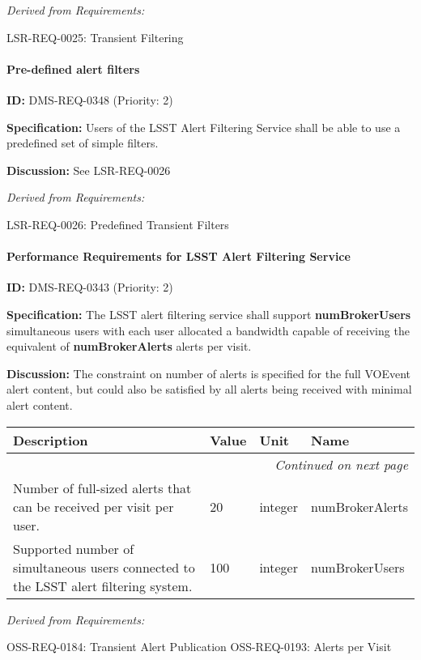 \documentclass[SE,toc,lsstdraft]{lsstdoc}
\makeatletter
\newcommand{\paramname}[1]{\hspace{0pt}#1}
\newcommand{\unitname}[1]{\hspace{0pt}#1}
\newenvironment{parameters}[0]{%
\setlength\LTleft{0pt}
\setlength\LTright{\fill}
\begin{small}
\begin{longtable}[]{|p{0.49\textwidth}|l|p{0.6in}|p{1.70in}@{}|}

\hline \textbf{Description} & \textbf{Value} & \textbf{Unit} & \textbf{Name} \\ \hline
\endhead

\hline \multicolumn{4}{r}{\emph{Continued on next page}} \\
\endfoot

\hline\hline
\endlastfoot
}{%
\hline
\end{longtable}
\end{small}
}
\makeatother
\begin{document}
\emph{Derived from Requirements:}

LSR-REQ-0025:
Transient Filtering \newline

\paragraph{Pre-defined alert filters}\hfill  %

\label{DMS-REQ-0348}
\textbf{ID:} DMS-REQ-0348 (Priority: 2)

\textbf{Specification: }Users of the LSST Alert Filtering Service shall be able to use a predefined set of simple filters.

\textbf{Discussion:} See LSR-REQ-0026

\emph{Derived from Requirements:}

LSR-REQ-0026:
Predefined Transient Filters \newline

\paragraph{Performance Requirements for LSST Alert Filtering Service}\hfill  %

\label{DMS-REQ-0343}
\textbf{ID:} DMS-REQ-0343 (Priority: 2)

\textbf{Specification:} The LSST alert filtering service shall support \textbf{numBrokerUsers} simultaneous users with each user allocated a bandwidth capable of receiving the equivalent of \textbf{numBrokerAlerts} alerts per visit.

\textbf{Discussion:} The constraint on number of alerts is specified for the full VOEvent alert content, but could also be satisfied by all alerts being received with minimal alert content.

\begin{parameters}
 Number of full-sized alerts that can be received per visit per user.
&
20
&
\unitname{%
integer
}
&
\paramname{%
numBrokerAlerts
} \\\hline
Supported number of simultaneous users connected to the LSST alert filtering system.
&
100
&
\unitname{%
integer
}
&
\paramname{%
numBrokerUsers
} \\\hline
\end{parameters}

\emph{Derived from Requirements:}

OSS-REQ-0184:
Transient Alert Publication \newline
OSS-REQ-0193:
Alerts per Visit \newline
\end{document}
